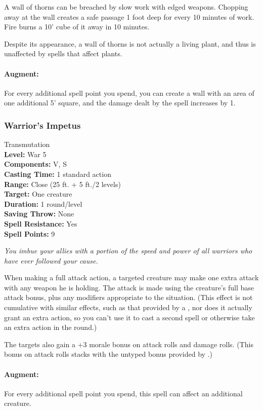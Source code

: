 A wall of thorns can be breached by slow work with edged weapons. Chopping away at the wall creates a safe passage 1 foot deep for every 10 minutes of work. Fire burns a 10' cube of it away in 10 minutes.

Despite its appearance, a wall of thorns is not actually a living plant, and thus is unaffected by spells that affect plants.

\paragraph{Augment:} For every additional spell point you spend, you can create a wall with an area of one additional 5' square, and the damage dealt by the spell increases by 1.
\subsubsection{Warrior's Impetus}
\label{Spell:WarriorsImpetus}
Transmutation
\\ \textbf{Level:} War 5
\\ \textbf{Components:} V, S
\\ \textbf{Casting Time:} 1 standard action
\\ \textbf{Range:} Close (25 ft. + 5 ft./2 levels)
\\ \textbf{Target:} One creature
\\ \textbf{Duration:} 1 round/level
\\ \textbf{Saving Throw:} None
\\ \textbf{Spell Resistance:} Yes
\\ \textbf{Spell Points:} 9

\emph{You imbue your allies with a portion of the speed and power of all warriors who have ever followed your cause.}

When making a full attack action, a targeted creature may make one extra attack with any weapon he is holding. 
The attack is made using the creature's full base attack bonus, plus any modifiers appropriate to the situation. 
(This effect is not cumulative with similar effects, such as that provided by a , nor does it actually grant an extra action, so you can't use it to cast a second spell or otherwise take an extra action in the round.)

The targets also gain a +3 morale bonus on attack rolls and damage rolls. (This bonus on attack rolls stacks with the untyped bonus provided by .)
\paragraph{Augment:} For every additional spell point you spend, this spell can affect an additional creature.
